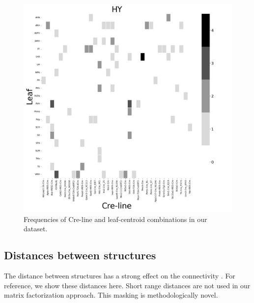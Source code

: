 \begin{figure}[H]
    \centering
    \includegraphics[width = 7in]{figs/HY centroid density.png} 
    \caption{Frequencies of Cre-line and leaf-centroid combinations in our dataset.}
    \label{fig:my_label}
\end{figure}

\newpage

\subsection{Distances between structures}

The distance between structures has a strong effect on the connectivity \citep{Knox2019-ot}.
For reference, we show these distances here.
Short range distances are not used in our matrix factorization approach.
This masking is methodologically novel.

